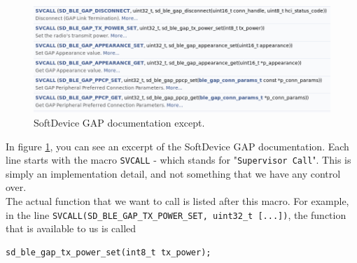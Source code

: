 \documentclass[11pt,a4paper]{article}
\begin{document}
\begin{figure}[h]
\centering
\includegraphics[width=0.9\linewidth]{softdevice_documentation_example.png}
\caption{SoftDevice GAP documentation except.}
\label{fig::gap_documentation_excerpt}
\end{figure}

\noindent
In figure \ref{fig::gap_documentation_excerpt}, you can see an excerpt of the SoftDevice GAP documentation. Each line starts with the macro \texttt{SVCALL} - which stands for "\texttt{Supervisor Call}". This is simply an implementation detail, and not something that we have any control over.\\
The actual function that we want to call is listed after this macro. For example, in the line \texttt{SVCALL(SD_BLE_GAP_TX_POWER_SET, uint32_t [...])}, the function that is available to us is called

\begin{verbatim}
sd_ble_gap_tx_power_set(int8_t tx_power);
\end{verbatim}
\end{document}
